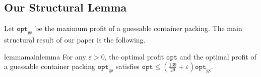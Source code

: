 \documentclass[10pt,a4paper]{amsart}
\newcommand{\kvn}[1]{#1}
\newcommand{\kvnr}[1]{}
\newcommand{\eps}{\varepsilon}
\renewcommand{\epsilon}{\varepsilon} %
\newcommand{\AM}{\mathcal{A}}
\newcommand{\NFDH}{\texttt{NFDH}\xspace}
\newcommand{\tNFDH}{\texttt{3D-NFDH}\xspace}
\theoremstyle{definition}
\newcommand{\opt}{\mathtt{opt}}
\newcommand{\optgs}{\mathtt{opt}_{\mathrm{gs}}}
\begin{document}



\subsection{Our Structural Lemma}
Let $\optgs$ be the maximum profit of a guessable container packing. The main structural result of our paper is the following.

\begin{restatable}{lemma}{mainlemma}
\label{thm:mainthm}
For any $\epsilon > 0$, the optimal profit $\opt$ and the optimal profit of a guessable container packing $\optgs$ satisfies $\opt \le \left(\frac{139}{29}+\epsilon\right)\optgs$.
\end{restatable}
\end{document}
